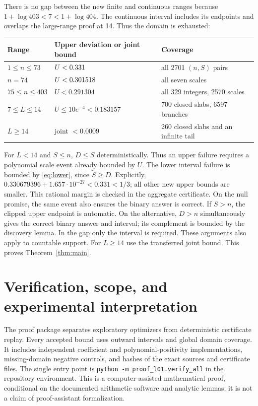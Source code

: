 \documentclass[11pt]{article}
\begin{document}
There is no gap between the new finite and continuous ranges because
$1+\log403<7<1+\log404$. The continuous interval includes its endpoints
and overlaps the large-range proof at 14. Thus the domain is exhausted:
\begin{center}
\begin{tabular}{lll}\toprule
Range & Upper deviation or joint bound & Coverage\\\midrule
$1\le n\le73$ & $U<0.331$ & all 2701 $(n,S)$ pairs\\
$n=74$ & $U<0.301518$ & all seven scales\\
$75\le n\le403$ & $U<0.291304$ & all 329 integers, 2570 scales\\
$7\le L\le14$ & $U\le10e^{-4}<0.183157$ & 700 closed slabs, 6597 branches\\
$L\ge14$ & joint $<0.0009$ & 260 closed slabs and an infinite tail\\\bottomrule
\end{tabular}
\end{center}
For $L<14$ and $S\le n$, $D\le S$ deterministically. Thus an upper
failure requires a polynomial scale event already bounded by $U$.
The lower interval failure is bounded by \eqref{eq:lower}, since
$\widetilde S\ge D$. Explicitly,
$0.330679396+1.657\cdot10^{-27}<0.331<1/3$; all other new upper
bounds are smaller. This rational margin is checked in the aggregate
certificate. On the null promise, the
same event also ensures the binary answer is correct.
If $S>n$, the clipped upper endpoint is automatic. On the alternative,
$D>n$ simultaneously gives the correct binary answer and interval;
its complement is bounded by the discovery lemma. In the gap only the
interval is required. These arguments also apply to countable support.
For $L\ge14$ use the transferred joint bound. This proves
Theorem~\ref{thm:main}.

\section{Verification, scope, and experimental interpretation}
The proof package separates exploratory optimizers from deterministic
certificate replay. Every accepted bound uses outward intervals and
global domain coverage. It includes independent coefficient and
polynomial-positivity implementations, missing-domain negative controls,
and hashes of the exact sources and certificate files. The single
entry point is \texttt{python -m proof\_l01.verify\_all} in the repository
environment. This is a computer-assisted mathematical proof, conditional
on the documented arithmetic software and analytic lemmas; it is not a
claim of proof-assistant formalization.
\end{document}
